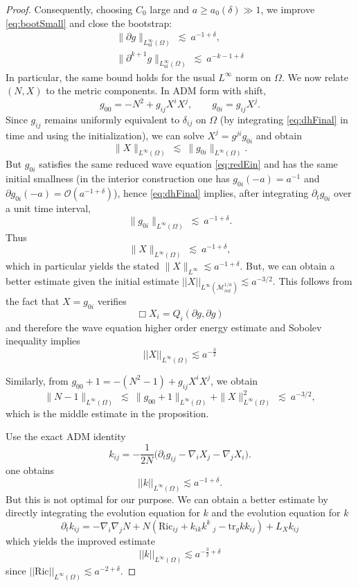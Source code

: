 \documentclass{amsart}
\newcommand{\tr}{\mbox{tr}}
\begin{document}
{\begin{proof}
\noindent 
Consequently, choosing $C_0$ large and $a\ge a_0(\delta)\gg 1$, we improve \eqref{eq:bootSmall} and close the bootstrap:
\begin{eqnarray}\label{eq:dhFinal}
\|\partial g\|_{L^\infty_{\mathrm{ul}}(\Omega)}\ \lesssim\ a^{-1+\delta},\\
\|\partial^{k+1} g\|_{L^\infty_{\mathrm{ul}}(\Omega)}\ \lesssim\ a^{-k-1+\delta}
\end{eqnarray}
In particular, the same bound holds for the usual $L^\infty$ norm on $\Omega$. 
\medskip
\noindent
We now relate $(N,X)$ to the metric components. In ADM form with shift,
\[
g_{00}=-N^2+g_{ij}X^iX^j,\qquad g_{0i}=g_{ij}X^j.
\]
Since $g_{ij}$ remains uniformly equivalent to $\delta_{ij}$ on $\Omega$ (by integrating \eqref{eq:dhFinal} in time and
using the initialization), we can solve $X^j=g^{ji}g_{0i}$ and obtain
\begin{equation}\label{eq:Xfromg0i}
\|X\|_{L^\infty(\Omega)}\ \lesssim\ \|g_{0i}\|_{L^\infty(\Omega)}.
\end{equation}
But $g_{0i}$ satisfies the same reduced wave equation \eqref{eq:redEin} and has the same initial smallness
(in the interior construction one has $g_{0i}(-a)=a^{-1}$ and $\partial g_{0i}(-a)=\mathcal{O}(a^{-1+\delta})$), hence
\eqref{eq:dhFinal} implies, after integrating $\partial_t g_{0i}$ over a unit time interval,
\[
\|g_{0i}\|_{L^\infty(\Omega)}\ \lesssim\ a^{-1+\delta}.
\]
Thus
\begin{equation}\label{eq:XFinalStrong}
\|X\|_{L^\infty(\Omega)}\ \lesssim\ a^{-1+\delta},
\end{equation}
which in particular yields the stated $\|X\|_{L^\infty}\lesssim a^{-1+\delta}$. But, we can obtain a better estimate given the initial estimate $||X||_{L^{\infty}(\mathcal{M}^{1/a}_{int})}\lesssim a^{-3/2}$. This follows from the fact that $X=g_{0i}$ verifies 
\[
\Box X_{i}=Q_{i}(\partial g,\partial g)
\]
and therefore the wave equation higher order energy estimate and Sobolev inequality implies 
\[
||X||_{L^{\infty}(\Omega)}\lesssim a^{-\frac{3}{2}}
\]


\noindent Similarly, from $g_{00}+1=-(N^2-1)+g_{ij}X^iX^j$, we obtain
\[
\|N-1\|_{L^\infty(\Omega)}
\ \lesssim\ \|g_{00}+1\|_{L^\infty(\Omega)}+\|X\|_{L^\infty(\Omega)}^2
\ \lesssim\ a^{-3/2},
\]
which is the middle estimate in the proposition.

\medskip
\noindent
Use the exact ADM identity
\begin{equation}\label{eq:kADM}
k_{ij}=-\frac{1}{2N}\big(\partial_t g_{ij}-\nabla_i X_j-\nabla_j X_i\big).
\end{equation}
one obtains 
\[
||k||_{L^{\infty}(\Omega)}\lesssim a^{-1+\delta}.
\]
But this is not optimal for our purpose. We can obtain a better estimate by directly integrating the evolution equation for $k$ 
and the evolution equation for $k$
\[
\partial_{t}k_{ij}=-\nabla_{i}\nabla_{j}N+N(\text{Ric}_{ij}+k_{ik}k^{k}~_{j}-\tr_{g}kk_{ij})+L_{X}k_{ij}
\]
which yields the improved estimate 
\[
||k||_{L^{\infty}(\Omega)}\lesssim a^{-\frac{3}{2}+\delta}
\]
since $||\text{Ric}||_{L^{\infty}(\Omega)}\lesssim a^{-2+\delta}$.


\end{proof}}
\end{document}

